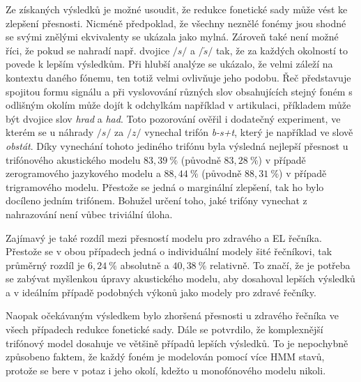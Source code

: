 Ze získaných výsledků je možné usoudit, že redukce fonetické sady může vést ke zlepšení přesnosti. Nicméně předpoklad, že všechny neznělé fonémy jsou shodné se svými znělými ekvivalenty se ukázala jako mylná. Zároveň také není možné říci, že pokud se nahradí např. dvojice $/s/$ a $/\check{s}/$ tak, že za každých okolností to povede k lepším výsledkům. Při hlubší analýze se ukázalo, že velmi záleží na kontextu daného fónemu, ten totiž velmi ovlivňuje jeho podobu. Řeč představuje spojitou formu signálu a při vyslovování různých slov obsahujících stejný foném s odlišným okolím  může dojít k odchylkám například v artikulaci, příkladem může být dvojice slov \textit{hrad} a \textit{had}. Toto pozorování ověřil i dodatečný experiment, ve kterém se u náhrady $/s/$ za $/z/$ vynechal trifón \textit{b-s+t}, který je například ve slově \textit{obstát}. Díky vynechání tohoto jediného trifónu byla výsledná nejlepší přesnost u trifónového akustického modelu $83,39\ \%$ (původně $83,28\ \%$) v případě zerogramového jazykového modelu a $88,44\ \%$ (původně $88,31\ \%$) v případě trigramového modelu. Přestože se jedná o marginální zlepšení, tak ho bylo docíleno jedním trifónem. Bohužel určení toho, jaké trifóny vynechat z nahrazování není vůbec triviální úloha.

Zajímavý je také rozdíl mezi přesností modelu pro zdravého a EL řečníka. Přestože se v obou případech jedná o individuální modely šité  řečníkovi, tak průměrný rozdíl je $6,24\ \%$ absolutně a $40,38\ \%$ relativně. To značí, že je potřeba se zabývat myšlenkou úpravy akustického modelu, aby dosahoval lepších výsledků a v ideálním případě podobných výkonů jako modely pro zdravé řečníky.

Naopak očekávaným výsledkem bylo zhoršená přesnosti u zdravého řečníka ve všech případech redukce fonetické sady. Dále se potvrdilo, že komplexnější trifónový model dosahuje ve většině případů lepších výsledků. To je nepochybně způsobeno faktem, že každý foném je modelován pomocí více HMM stavů, protože se bere v potaz i jeho okolí, kdežto u monofónového modelu nikoli.
